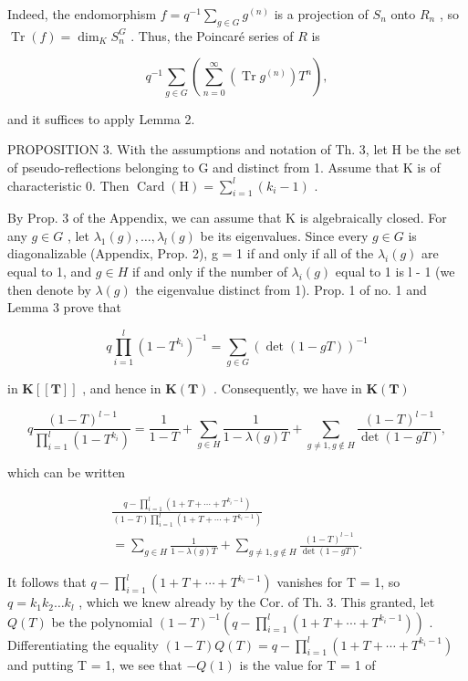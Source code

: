 Indeed, the endomorphism \(f = q^{-1} \sum_{g \in G} g^{(n)}\) is a projection of \(S_n\) onto \(R_n\) , so \(\operatorname{Tr}(f) = \dim_K S_n^G\) . Thus, the Poincaré series of \(R\) is

\[
q ^ {- 1} \sum_ {g \in G} \left(\sum_ {n = 0} ^ {\infty} (\operatorname{Tr} g ^ {(n)}) T ^ {n}\right),
\]

and it suffices to apply Lemma 2.

PROPOSITION 3. With the assumptions and notation of Th. 3, let H be the set of pseudo-reflections belonging to G and distinct from 1. Assume that K is of characteristic 0. Then \(\operatorname{Card}(\mathrm{H}) = \sum_{i=1}^{l}(k_i - 1)\) .

By Prop. 3 of the Appendix, we can assume that K is algebraically closed. For any \(g \in G\) , let \(\lambda_{1}(g), \ldots, \lambda_{l}(g)\) be its eigenvalues. Since every \(g \in G\) is diagonalizable (Appendix, Prop. 2), g = 1 if and only if all of the \(\lambda_{i}(g)\) are equal to 1, and \(g \in H\) if and only if the number of \(\lambda_{i}(g)\) equal to 1 is l - 1 (we then denote by \(\lambda(g)\) the eigenvalue distinct from 1). Prop. 1 of no. 1 and Lemma 3 prove that

\[
q \prod_ {i = 1} ^ {l} (1 - T ^ {k _ {i}}) ^ {- 1} = \sum_ {g \in G} (\det (1 - g T)) ^ {- 1}\tag{16}
\]

in \(\mathbf{K}[[\mathbf{T}]]\) , and hence in \(\mathbf{K}(\mathbf{T})\) . Consequently, we have in \(\mathbf{K}(\mathbf{T})\)

\[
q \frac {(1 - T) ^ {l - 1}}{\prod_ {i = 1} ^ {l} (1 - T ^ {k _ {i}})} = \frac {1}{1 - T} + \sum_ {g \in H} \frac {1}{1 - \lambda (g) T} + \sum_ {g \neq 1, g \notin H} \frac {(1 - T) ^ {l - 1}}{\det (1 - g T)},
\]

which can be written

\[
\begin{array}{c} \frac {q - \prod_ {i = 1} ^ {l} (1 + T + \cdots + T ^ {k _ {i} - 1})}{(1 - T) \prod_ {i = 1} ^ {l} (1 + T + \cdots + T ^ {k _ {i} - 1})} \\ = \sum_ {g \in H} \frac {1}{1 - \lambda (g) T} + \sum_ {g \neq 1, g \notin H} \frac {(1 - T) ^ {l - 1}}{\det (1 - g T)}. \end{array}\tag{17}
\]

It follows that \(q - \prod_{i=1}^{l} (1 + T + \cdots + T^{k_i - 1})\) vanishes for T = 1, so \(q = k_1 k_2 \ldots k_l\) , which we knew already by the Cor. of Th. 3. This granted, let \(Q(T)\) be the polynomial \((1 - T)^{-1}(q - \prod_{i=1}^{l} (1 + T + \cdots + T^{k_i - 1}))\) . Differentiating the equality \((1 - T)Q(T) = q - \prod_{i=1}^{l} (1 + T + \cdots + T^{k_i - 1})\) and putting T = 1, we see that \(-Q(1)\) is the value for T = 1 of

